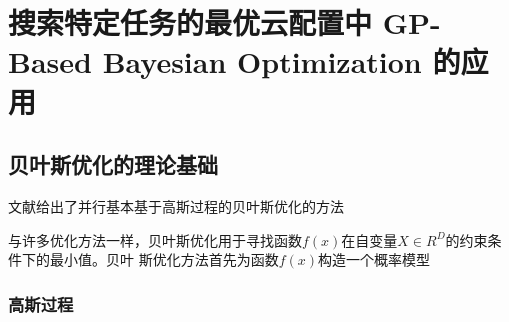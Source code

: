 
\chapter{搜索特定任务的最优云配置中 GP-Based Bayesian Optimization 的应用}
\section{贝叶斯优化的理论基础}
 文献给出了并行基本基于高斯过程的贝叶斯优化的方法

与许多优化方法一样，贝叶斯优化用于寻找函数$f(x)$在自变量$X \in R^D$的约束条件下的最小值。贝叶
斯优化方法首先为函数$f(x)$构造一个概率模型


\subsection{高斯过程}

\subsection{}
\section{}
